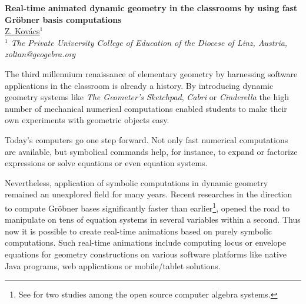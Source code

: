 \documentclass[11pt]{article}
\begin{document}
%
\vspace{-0.8cm}
\begin{flushleft}
\Large \textbf{\noindent
Real-time animated dynamic geometry in the classrooms
by using fast Gr\"obner basis computations}
\\
\vspace{0.5cm}
\normalsize
\normalsize{
 \underline{Z. Kov\'acs}$^1$
} \\
\vspace{5mm}
\textit{\footnotesize
$^1$  The Private University College of Education of the Diocese of Linz, Austria,
zoltan@geogebra.org\\
}
\end{flushleft}

The third millennium renaissance of elementary geometry by harnessing software applications in the classroom is already a history. By introducing dynamic geometry systems like \textit{The Geometer's Sketchpad}, \textit{Cabri} or \textit{Cinderella} the high number of mechanical numerical computations enabled students to make their own experiments with geometric objects easy.

Today's computers go one step forward. Not only fast numerical computations are available, but symbolical commands help, for instance, to expand or factorize expressions or solve equations or even equation systems.

Nevertheless, application of symbolic computations in dynamic geometry remained an unexplored field for many years. Recent researches in the direction to compute Gr\"obner bases significantly faster than earlier\footnote{See \cite{KP,K15} for two studies among the open source computer algebra systems.}, opened the road to manipulate on tens of equation systems in several variables within a second. Thus now it is possible to create real-time animations based on purely symbolic computations.
Such real-time animations include computing locus or envelope equations for geometry constructions on various software platforms like native Java programs, web applications or mobile/tablet solutions.
\end{document}
